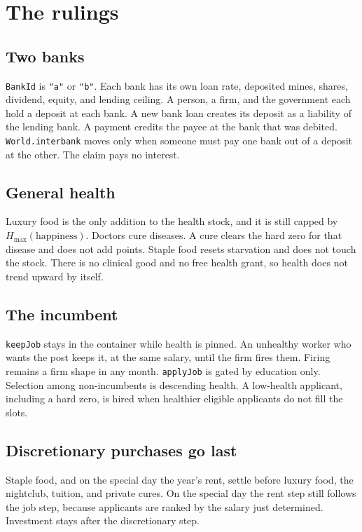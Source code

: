 \documentclass[11pt]{article}
\begin{document}
\section{The rulings}
\label{sec:decisions}

\subsection{Two banks}

\texttt{BankId} is \texttt{"a"} or \texttt{"b"}. Each bank has its own loan
rate, deposited mines, shares, dividend, equity, and lending ceiling.
A person, a firm, and the government each hold a deposit at each bank.
A new bank loan creates its deposit as a liability of the lending bank.
A payment credits the payee at the bank that was debited.
\texttt{World.interbank} moves only when someone must pay one bank out of a
deposit at the other. The claim pays no interest.

\subsection{General health}

Luxury food is the only addition to the health stock, and it is still capped
by $H_{\max}(\mathrm{happiness})$. Doctors cure diseases. A cure clears the
hard zero for that disease and does not add points. Staple food resets
starvation and does not touch the stock. There is no clinical good and no
free health grant, so health does not trend upward by itself.

\subsection{The incumbent}

\texttt{keepJob} stays in the container while health is pinned. An unhealthy
worker who wants the post keeps it, at the same salary, until the firm fires
them. Firing remains a firm shape in any month.
\texttt{applyJob} is gated by education only. Selection among non-incumbents
is descending health. A low-health applicant, including a hard zero, is
hired when healthier eligible applicants do not fill the slots.

\subsection{Discretionary purchases go last}

Staple food, and on the special day the year's rent, settle before luxury
food, the nightclub, tuition, and private cures. On the special day the rent
step still follows the job step, because applicants are ranked by the salary
just determined. Investment stays after the discretionary step.
\end{document}
